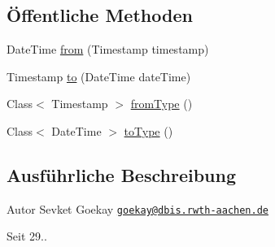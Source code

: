 \subsection*{Öffentliche Methoden}
\begin{DoxyCompactItemize}
\item 
Date\+Time \hyperlink{classde_1_1rwth_1_1idsg_1_1steve_1_1utils_1_1_date_time_converter_a727bb2e6902c1bdce4a0a2b90f1597b1}{from} (Timestamp timestamp)
\item 
Timestamp \hyperlink{classde_1_1rwth_1_1idsg_1_1steve_1_1utils_1_1_date_time_converter_af250ea4f487860a6ec72a7006998f5b5}{to} (Date\+Time date\+Time)
\item 
Class$<$ Timestamp $>$ \hyperlink{classde_1_1rwth_1_1idsg_1_1steve_1_1utils_1_1_date_time_converter_ad7e502df3f70c7171fa3b1ca5a5a77d6}{from\+Type} ()
\item 
Class$<$ Date\+Time $>$ \hyperlink{classde_1_1rwth_1_1idsg_1_1steve_1_1utils_1_1_date_time_converter_a14d461d996f714801a0e2b35cfd61d63}{to\+Type} ()
\end{DoxyCompactItemize}


\subsection{Ausführliche Beschreibung}
\begin{DoxyAuthor}{Autor}
Sevket Goekay \href{mailto:goekay@dbis.rwth-aachen.de}{\tt goekay@dbis.\+rwth-\/aachen.\+de} 
\end{DoxyAuthor}
\begin{DoxySince}{Seit}
29.. 
\end{DoxySince}


